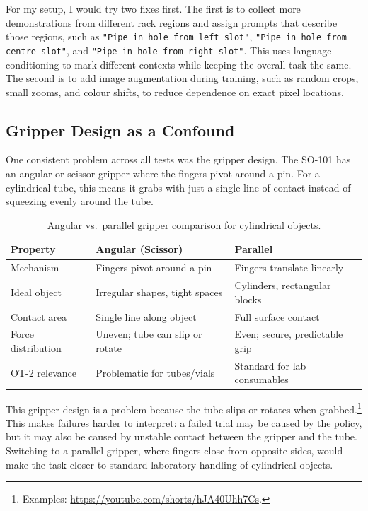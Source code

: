 \documentclass[11pt, a4paper]{article}
\begin{document}
For my setup, I would try two fixes first. The first is to collect more demonstrations from different rack regions and assign prompts that describe those regions, such as \texttt{"Pipe in hole from left slot"}, \texttt{"Pipe in hole from centre slot"}, and \texttt{"Pipe in hole from right slot"}. This uses language conditioning to mark different contexts while keeping the overall task the same. The second is to add image augmentation during training, such as random crops, small zooms, and colour shifts, to reduce dependence on exact pixel locations.

\subsection{Gripper Design as a Confound}
\label{sec:gripper}

One consistent problem across all tests was the gripper design. The SO-101 has an angular or scissor gripper where the fingers pivot around a pin. For a cylindrical tube, this means it grabs with just a single line of contact instead of squeezing evenly around the tube.

\begin{table}[H]
\centering
\renewcommand{\arraystretch}{1.2}
\begin{tabular}{@{}p{}p{}p{}@{}}
\toprule
\textbf{Property} & \textbf{Angular (Scissor)} & \textbf{Parallel} \\ \midrule
Mechanism       & Fingers pivot around a pin       & Fingers translate linearly \\
Ideal object    & Irregular shapes, tight spaces   & Cylinders, rectangular blocks \\
Contact area    & Single line along object         & Full surface contact \\
Force distribution & Uneven; tube can slip or rotate & Even; secure, predictable grip \\
OT-2 relevance  & Problematic for tubes/vials      & Standard for lab consumables \\ \bottomrule
\end{tabular}
\caption{Angular vs.\ parallel gripper comparison for cylindrical objects.}
\label{tab:grippers}
\end{table}

This gripper design is a problem because the tube slips or rotates when grabbed.\footnote{Examples: \url{https://youtube.com/shorts/hJA40Uhh7Cs}.} This makes failures harder to interpret: a failed trial may be caused by the policy, but it may also be caused by unstable contact between the gripper and the tube. Switching to a parallel gripper, where fingers close from opposite sides, would make the task closer to standard laboratory handling of cylindrical objects.
\end{document}

